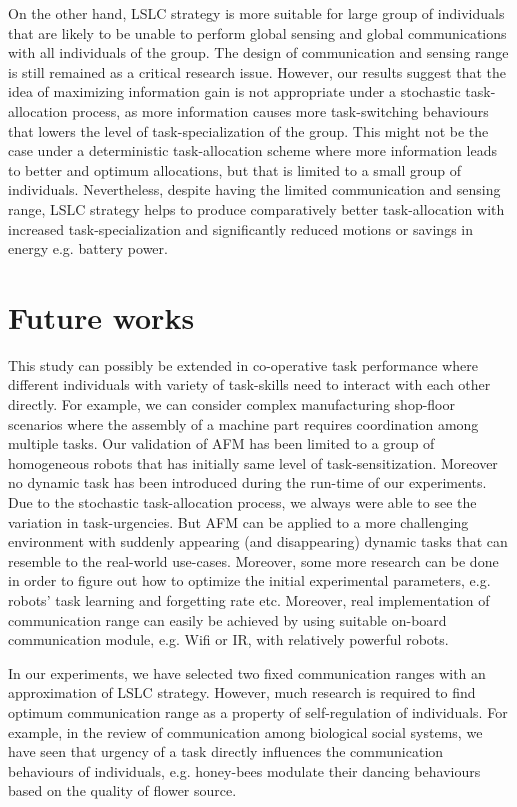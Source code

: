\documentclass{intech}
\begin{document}
On the other hand, LSLC strategy is more suitable for large group of individuals that are likely to be unable to perform global sensing and global communications with all individuals of the group. The design of communication and sensing range is still remained as a critical research issue. However, our results suggest that the idea of maximizing information gain is not appropriate under a stochastic task-allocation process, as more information causes more task-switching behaviours that lowers the level of task-specialization of the group. This might not be the case under a deterministic task-allocation scheme where more information leads to better and optimum allocations, but that is limited to a small group of individuals. Nevertheless, despite having the limited communication and sensing range, LSLC strategy helps to produce comparatively better task-allocation with increased task-specialization and significantly reduced motions or savings in energy e.g. battery power. 
\section{Future works}
This study can possibly be extended in co-operative task performance where different individuals with variety of task-skills need to interact with each other directly. For example, we can consider complex manufacturing shop-floor scenarios where the assembly of a machine part requires coordination among multiple tasks. Our validation of AFM has been limited to a group of homogeneous robots that has initially same level of task-sensitization. Moreover no dynamic task has been introduced during the run-time of our experiments. Due to the stochastic task-allocation process, we always were able to see the  variation in task-urgencies. But AFM can be applied to a more challenging environment with suddenly appearing (and disappearing) dynamic tasks that can resemble to the real-world use-cases. Moreover, some more research can be done in order to figure out how to optimize the initial experimental parameters, e.g. robots' task learning and forgetting rate etc. Moreover, real implementation of communication range can easily be achieved by using suitable on-board communication module, e.g. Wifi or IR, with  relatively powerful robots.

In our experiments, we have selected two fixed communication ranges with an approximation of LSLC strategy. However, much research is required to find optimum communication range as a property of self-regulation of individuals. For example, in the review of communication among biological social systems, we have seen that urgency of a task directly influences the communication behaviours of individuals, e.g. honey-bees modulate their dancing behaviours based on the quality of flower source.
 
\end{document}
